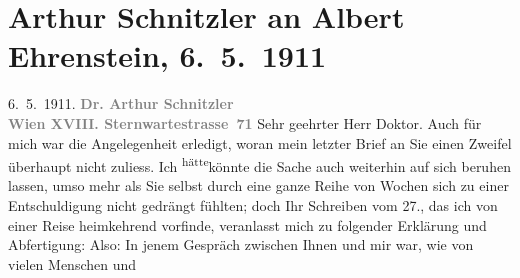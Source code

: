 

         
         \renewcommand{\erwaehntePersonen}{Personen: Albert Ehrenstein, Stefan Großmann, Karl Kraus}
         \renewcommand{\erwaehnteOrte}{Orte: Sternwartestraße, Wien}
         \renewcommand{\erwaehnteWerke}{}
               \section[Arthur Schnitzler an Albert Ehrenstein, 6. 5. 1911]{ Arthur Schnitzler an Albert Ehrenstein, 6. 5. 1911}\nopagebreak{}\rehead{ }\begin{ledgroupsized}[t]{13cm}\normalsize\beginnumbering \toendnotes[C]{\smallbreak\pagebreak[2]} 
\toendnotes[C]{\smallbreak}\pstart
           \raggedleft{}{\pb}6. 5. 1911.\pend
           \pstart
           \textcolor{gray}{\textbf{Dr. Arthur Schnitzler}}{\\}\textcolor{gray}{\textbf{Wien XVIII. Sternwartestrasse 71}}\pend
           \pstart{}Sehr geehrter Herr Doktor.\pend\pstart
           Auch für mich war die Angelegenheit erledigt, woran mein letzter Brief an Sie einen
               Zweifel überhaupt nicht zuliess. Ich \substVorne{}\textsuperscript{hätte}\substDazwischen{}könnte\substHinten{} die Sache auch weiterhin auf sich beruhen lassen, umso mehr als Sie selbst
               durch eine ganze Reihe von Wochen sich zu einer Entschuldigung nicht gedrängt
               fühlten; doch Ihr Schreiben vom 27., das ich von einer Reise heimkehrend
               vorfinde, veranlasst mich zu folgender Erklärung und Abfertigung:\pend
           \pstart
           Also: In jenem Gespräch zwischen Ihnen und mir war, wie von vielen Menschen und

\end{ledgroupsized}
